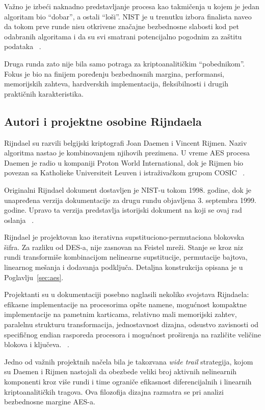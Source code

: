 Važno je izbeći naknadno predstavljanje procesa kao takmičenja u kojem
je jedan algoritam bio ``dobar'', a ostali ``loši''. NIST je u trenutku
izbora finalista naveo da tokom prve runde nisu otkrivene značajne
bezbednosne slabosti kod pet odabranih algoritama i da su svi smatrani
potencijalno pogodnim za zaštitu podataka
~\cite{nist-aes-finalists-1999}.

Druga runda zato nije bila samo potraga za kriptoanalitičkim
``pobednikom''. Fokus je bio na finijem poređenju bezbednosnih margina,
performansi, memorijskih zahteva, hardverskih implementacija,
fleksibilnosti i drugih praktičnih karakteristika.


\subsection{Autori i projektne osobine Rijndaela}
\label{subsec:rijndael_autori}

Rijndael su razvili belgijski kriptografi Joan Daemen i Vincent Rijmen.
Naziv algoritma nastao je kombinovanjem njihovih prezimena.
U vreme AES procesa Daemen je radio u kompaniji Proton World
International, dok je Rijmen bio povezan sa Katholieke Universiteit
Leuven i istraživačkom grupom COSIC
~\cite{rijndael-proposal-1999,nist-rijndael-selection-2000}.

Originalni Rijndael dokument dostavljen je NIST-u tokom 1998. godine,
dok je unapređena verzija dokumentacije za drugu rundu objavljena
3. septembra 1999. godine. Upravo ta verzija predstavlja istorijski
dokument na koji se ovaj rad oslanja
~\cite{rijndael-proposal-1999}.

Rijndael je projektovan kao iterativna supstituciono-permutaciona
blokovska šifra. Za razliku od DES-a, nije zasnovan na Feistel mreži.
Stanje se kroz niz rundi transformiše kombinacijom nelinearne
supstitucije, permutacije bajtova, linearnog mešanja i dodavanja
podključa. Detaljna konstrukcija opisana je u
Poglavlju~\ref{sec:aes}.

Projektanti su u dokumentaciji posebno naglasili nekoliko svojstava
Rijndaela:
efikasne implementacije na procesorima opšte namene, mogućnost kompaktne implementacije na pametnim karticama, relativno mali memorijski zahtev, paralelnu strukturu transformacija, jednostavnost dizajna, odsustvo zavisnosti od specifičnog endian rasporeda procesora i mogućnost proširenja na različite veličine blokova i ključeva.
~\cite{rijndael-proposal-1999}.

Jedno od važnih projektnih načela bila je takozvana
\emph{wide trail} strategija, kojom su Daemen i Rijmen nastojali da
obezbede veliki broj aktivnih nelinearnih komponenti kroz više rundi i
time ograniče efikasnost diferencijalnih i linearnih kriptoanalitičkih
tragova. Ova filozofija dizajna razmatra se pri analizi
bezbednosne margine AES-a.


